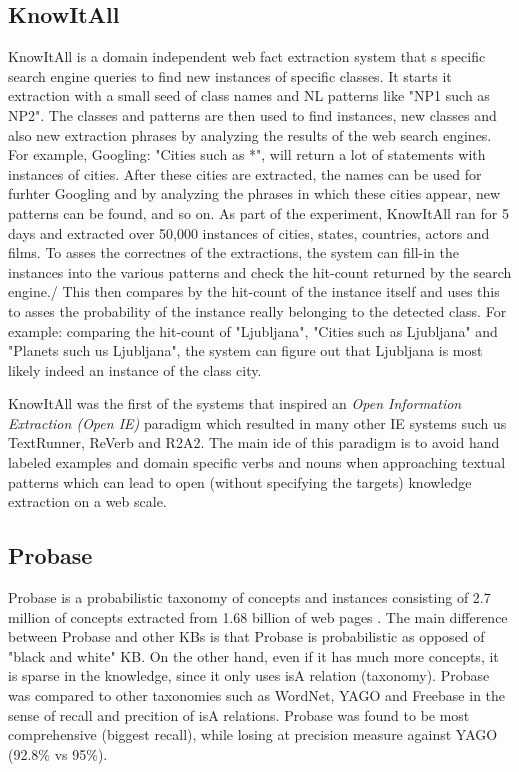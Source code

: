 \subsection{KnowItAll}
\label{section:rw_KnowItAll}
KnowItAll\parencite{Etzioni2004} is a domain independent web fact extraction 
system that s specific search engine queries to find new instances of specific
classes. It starts it extraction with a small seed of class names and NL patterns
like "NP1 such as NP2". The classes and patterns are then used to find instances,
new classes and also new extraction phrases by analyzing the results of the 
web search engines. For example, Googling: "Cities such as *", will return 
a lot of statements with instances of cities. After these cities are extracted,
the names can be used for furhter Googling and by analyzing the phrases in which
these cities appear, new patterns can be found, and so on. As part of the
experiment, KnowItAll ran for 5 days and extracted over 50,000 instances of
cities, states, countries, actors and films.
To asses the correctnes of the extractions, the system can fill-in the instances
into the various patterns and check the hit-count returned by the search engine./
This then compares by the hit-count of the instance itself and uses this to
asses the probability of the instance really belonging to the detected class.
For example: comparing the hit-count of "Ljubljana", "Cities such as Ljubljana"
and "Planets such us Ljubljana", the system can figure out that Ljubljana is
most likely indeed an instance of the class city.

KnowItAll was the first of the systems that inspired an \emph{Open Information
Extraction (Open IE)} paradigm\parencite{Etzioni2011} which resulted in many 
other IE systems such us TextRunner, ReVerb and R2A2. The main ide of this
paradigm is to avoid hand labeled examples and domain specific verbs and nouns
when approaching textual patterns which can lead to open (without specifying the
targets) knowledge extraction on a web scale.

\subsection{Probase}
\label{section:rw_Probase}
Probase is a probabilistic taxonomy of concepts and instances consisting of
2.7 million of concepts extracted from 1.68 billion of web pages
\parencite{Wu2012}. The main difference between Probase and other KBs is that
Probase is probabilistic as opposed of "black and white" KB. On the other hand,
even if it has much more concepts, it is sparse in the knowledge, since it only
uses isA relation (taxonomy). Probase was compared to other taxonomies such as
WordNet, YAGO and Freebase in the sense of recall and precition of isA 
relations. Probase was found to be most comprehensive (biggest recall), while
losing at precision measure against YAGO (92.8\% vs 95\%). 

